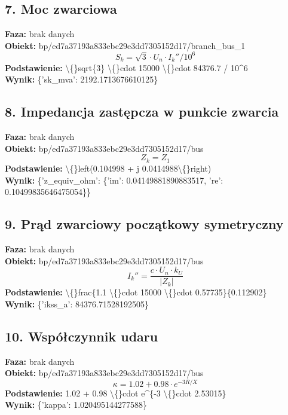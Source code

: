 ﻿\documentclass[11pt]{article}
\begin{document}
\subsection*{7. Moc zwarciowa}
\textbf{Faza:} brak danych\\
\textbf{Obiekt:} bp/ed7a37193a833ebc29e3dd7305152d17/branch\_bus\_1\\
\[
S_k = \sqrt{3} \cdot U_n \cdot I_{k}'' / 10^6
\]
\textbf{Podstawienie:} \textbackslash\{\}sqrt\{3\} \textbackslash\{\}cdot 15000 \textbackslash\{\}cdot 84376.7 / 10\textasciicircum{}6\\
\textbf{Wynik:} \{'sk\_mva': 2192.1713676610125\}\\
\subsection*{8. Impedancja zastępcza w punkcie zwarcia}
\textbf{Faza:} brak danych\\
\textbf{Obiekt:} bp/ed7a37193a833ebc29e3dd7305152d17/bus\\
\[
Z_k = Z_1
\]
\textbf{Podstawienie:} \textbackslash\{\}left(0.104998 + j 0.0414988\textbackslash\{\}right)\\
\textbf{Wynik:} \{'z\_equiv\_ohm': \{'im': 0.04149881890883517, 're': 0.10499835646475054\}\}\\
\subsection*{9. Prąd zwarciowy początkowy symetryczny}
\textbf{Faza:} brak danych\\
\textbf{Obiekt:} bp/ed7a37193a833ebc29e3dd7305152d17/bus\\
\[
I_{k}'' = \frac{c \cdot U_n \cdot k_U}{\left|Z_k\right|}
\]
\textbf{Podstawienie:} \textbackslash\{\}frac\{1.1 \textbackslash\{\}cdot 15000 \textbackslash\{\}cdot 0.57735\}\{0.112902\}\\
\textbf{Wynik:} \{'ikss\_a': 84376.71528192505\}\\
\subsection*{10. Współczynnik udaru}
\textbf{Faza:} brak danych\\
\textbf{Obiekt:} bp/ed7a37193a833ebc29e3dd7305152d17/bus\\
\[
\kappa = 1.02 + 0.98 \cdot e^{-3 R/X}
\]
\textbf{Podstawienie:} 1.02 + 0.98 \textbackslash\{\}cdot e\textasciicircum{}\{-3 \textbackslash\{\}cdot 2.53015\}\\
\textbf{Wynik:} \{'kappa': 1.020495144277588\}\\
\end{document}
